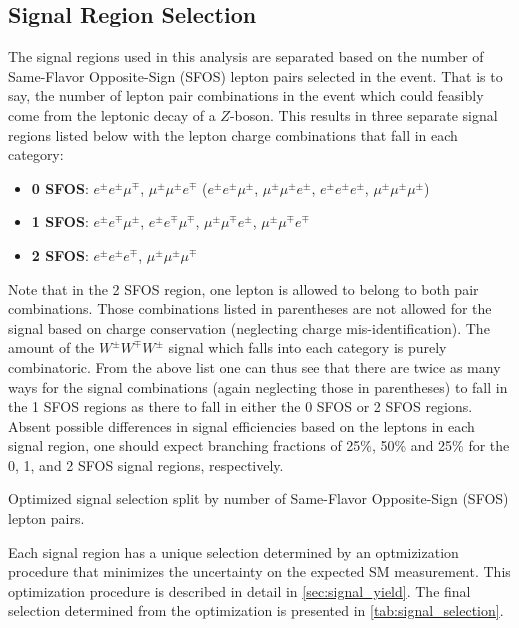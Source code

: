\subsection{Signal Region Selection}
\label{sec:signal_regions}
The signal regions used in this analysis are separated based on the number of 
Same-Flavor Opposite-Sign (SFOS) lepton pairs selected in the event.  That is to say,
the number of lepton pair combinations in the event 
which could feasibly come from the leptonic decay of a $Z$-boson.
This results in three separate signal regions listed 
below with the lepton charge combinations
that fall in each category:
\begin{itemize}
\item \textbf{0 SFOS}: $e^{\pm}e^{\pm}\mu^{\mp}$, 
$\mu^{\pm}\mu^{\pm}e^{\mp}$ ($e^{\pm}e^{\pm}\mu^{\pm}$, 
$\mu^{\pm}\mu^{\pm}e^{\pm}$, $e^{\pm}e^{\pm}e^{\pm}$, $\mu^{\pm}\mu^{\pm}\mu^{\pm}$)
\item \textbf{1 SFOS}: $e^{\pm}e^{\mp}\mu^{\pm}$, 
$e^{\pm}e^{\mp}\mu^{\mp}$, $\mu^{\pm}\mu^{\mp}e^{\pm}$, $\mu^{\pm}\mu^{\mp}e^{\mp}$
\item \textbf{2 SFOS}: $e^{\pm}e^{\pm}e^{\mp}$, $\mu^{\pm}\mu^{\pm}\mu^{\mp}$
\end{itemize}
Note that in the 2 SFOS region, one lepton is allowed to belong to both 
pair combinations.
Those combinations listed in parentheses are not allowed for the signal based on charge conservation (neglecting charge mis-identification).  
The amount of the $W^{\pm}W^{\mp}W^{\pm}$ signal
which falls into each category is purely combinatoric.  
From the above list one can thus see that there are twice as many ways 
for the signal combinations (again neglecting those in parentheses)
to fall in the 1 SFOS regions as 
there to fall in either the 0 SFOS or 2 SFOS regions. 
Absent possible differences in signal efficiencies based on the leptons in each 
signal region, one should expect branching 
fractions of 25\%, 50\% and 25\% for the 0, 1, and 2 SFOS signal regions, respectively.


\begin{table}[ht!]
\centering
\begin{tiny}

\end{tiny}
\caption{Optimized signal selection split by number of Same-Flavor 
Opposite-Sign (SFOS) lepton pairs.}
\label{tab:signal_selection}
\end{table}

Each signal region has a unique selection determined by an optmizization
procedure that minimizes the uncertainty on the expected SM measurement. 
This optimization procedure is described in detail in \sec\ref{sec:signal_yield}.
The final selection determined from the optimization
is presented in \tab\ref{tab:signal_selection}.






